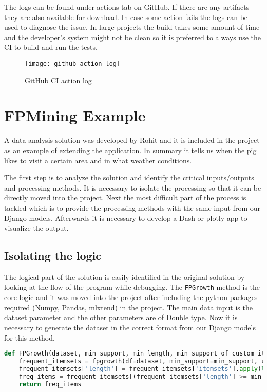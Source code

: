 The logs can be found under actions tab on GitHub. If there are any artifacts
they are also available for download. In case some action fails the logs can be
used to diagnose the issue. In large projects the build takes some amount of
time and the developer's system might not be clean so it is preferred to always
use the CI to build and run the tests.

\begin{figure}[H]
	\centering
	\texttt{[image: github\_action\_log]}
	\caption{GitHub CI action log}
	\label{fig:github_action_log}
\end{figure}

\section{FPMining Example}
\label{sec:fpmining_example}
A data analysis solution was developed by Rohit \cite{rohit_github} and it is included in the project as an example of extending the application.
In summary it tells us when the pig likes to visit a certain area and in what weather conditions.

The first step is to analyze the solution and identify the critical inputs/outputs and processing methods. It is necessary to 
isolate the processing so that it can be directly moved into the project. Next the most difficult part of the process is tackled which
is to provide the processing methods with the same input from our Django models. Afterwards it is necessary to develop a Dash or plotly app
to visualize the output.

\subsection{Isolating the logic}
The logical part of the solution is easily identified in the original solution by looking at the flow
of the program while debugging. The \texttt{FPGrowth} method is the core logic and it was moved into the project
after including the python packages required (Numpy, Pandas, mlxtend) in the project. The main data input is the dataset parameter and
the other parameters are of Double type. Now it is necessary to generate the dataset in the correct format from our Django models for this
method.

\begin{lstlisting}[language={Python}]
def FPGrowth(dataset, min_support, min_length, min_support_of_custom_itemsets):
    frequent_itemsets = fpgrowth(df=dataset, min_support=min_support, use_colnames=True, max_len=None)
    frequent_itemsets['length'] = frequent_itemsets['itemsets'].apply(lambda x: len(x))
    freq_items = frequent_itemsets[(frequent_itemsets['length'] >= min_length) & (frequent_itemsets['support'] >= min_support_of_custom_itemsets)]
    return freq_items
\end{lstlisting}

